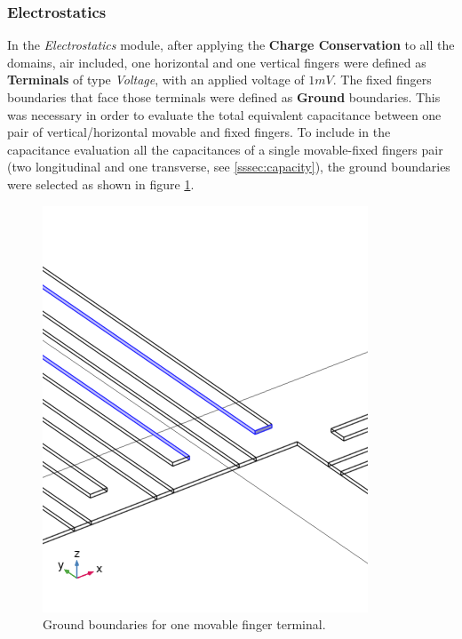 \documentclass[lettersize,journal]{IEEEtran}
\begin{document}
        
        
        \bigskip
        \subsubsection{Electrostatics}
        In the \textit{Electrostatics} module, after applying the \textbf{Charge Conservation} to all the domains, air included, one horizontal and one vertical fingers were defined as \textbf{Terminals} of type \textit{Voltage}, with an applied voltage of \(1mV\). The fixed fingers boundaries that face those terminals were defined as \textbf{Ground} boundaries. This was necessary in order to evaluate the total equivalent capacitance between one pair of vertical/horizontal movable and fixed fingers. To include in the capacitance evaluation all the capacitances of a single movable-fixed fingers pair (two longitudinal and one transverse, see \ref{sssec:capacity}), the ground boundaries were selected as shown in figure \ref{fig:grounds}.
        
        \begin{figure}[!h]
            \centering
            \includegraphics[width=1.0\linewidth]{grounds.png}
            \caption{Ground boundaries for one movable finger terminal.}
            \label{fig:grounds}
        \end{figure}
        
\end{document}
